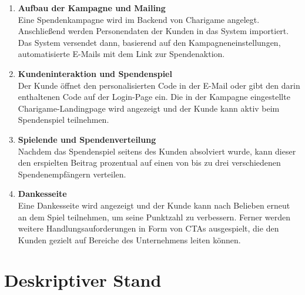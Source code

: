 \begin{enumerate}
    \item \textbf{Aufbau der Kampagne und Mailing}
    \\ Eine Spendenkampagne wird im Backend von Charigame angelegt.
    Anschließend werden Personendaten der Kunden in das System importiert.
    Das System versendet dann, basierend auf den Kampagneneinstellungen, automatisierte E-Mails mit dem Link zur Spendenaktion.
    \item \textbf{Kundeninteraktion und Spendenspiel}
    \\ Der Kunde öffnet den personalisierten Code in der E-Mail oder gibt den darin enthaltenen Code auf der Login-Page ein.
    Die in der Kampagne eingestellte Charigame-Landingpage wird angezeigt und der Kunde kann aktiv beim Spendenspiel teilnehmen.
    \item \textbf{Spielende und Spendenverteilung}
    \\ Nachdem das Spendenspiel seitens des Kunden absolviert wurde, kann dieser den erspielten Beitrag prozentual auf einen von bis zu drei verschiedenen Spendenempfängern verteilen.
    \item \textbf{Dankesseite}
    \\ Eine Dankesseite wird angezeigt und der Kunde kann nach Belieben erneut an dem Spiel teilnehmen, um seine Punktzahl zu verbessern.
    Ferner werden weitere Handlungsauforderungen in Form von CTAs ausgespielt, die den Kunden gezielt auf Bereiche des Unternehmens leiten können.
\end{enumerate}

\section{Deskriptiver Stand}
